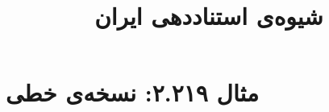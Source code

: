 \documentclass[a4paper,10pt]{article}
\begin{document}
\title{شیوه‌ی استناددهی ایران
 }
\author{}
\date{}
\maketitle



\section*{مثال ۲.۲۱۹: نسخه‌ی خطی}

\cite{نظامی}\\






\end{document}
